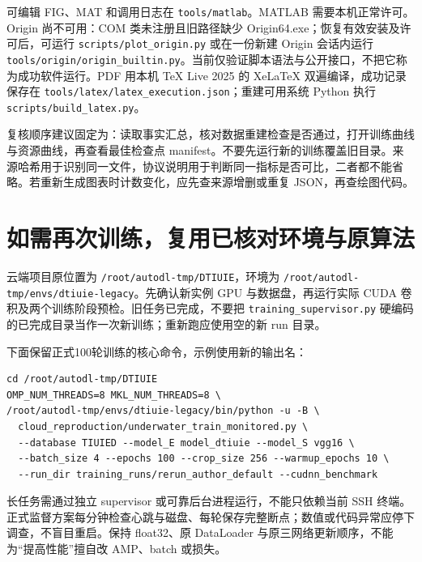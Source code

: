 \documentclass[UTF8,11pt,a4paper,fontset=windows]{ctexart}
\begin{document}
可编辑 FIG、MAT 和调用日志在 \texttt{tools/\allowbreak{}matlab\allowbreak{}}。MATLAB 需要本机正常许可。Origin 尚不可用：COM 类未注册且旧路径缺少 Origin64.exe；恢复有效安装及许可后，可运行 \texttt{scripts/\allowbreak{}plot\allowbreak{}\_\allowbreak{}origin.\allowbreak{}py} 或在一份新建 Origin 会话内运行 \texttt{tools/\allowbreak{}origin\allowbreak{}/\allowbreak{}origin\_\allowbreak{}buil\allowbreak{}tin.\allowbreak{}py}。当前仅验证脚本语法与公开接口，不把它称为成功软件运行。PDF 用本机 TeX Live 2025 的 XeLaTeX 双遍编译，成功记录保存在 \texttt{tools/\allowbreak{}latex/\allowbreak{}latex\_\allowbreak{}execut\allowbreak{}ion.\allowbreak{}json}；重建可用系统 Python 执行 \texttt{scripts/\allowbreak{}buil\allowbreak{}d\_\allowbreak{}latex.\allowbreak{}py}。

复核顺序建议固定为：读取事实汇总，核对数据重建检查是否通过，打开训练曲线与资源曲线，再查看最佳检查点 manifest。不要先运行新的训练覆盖旧目录。来源哈希用于识别同一文件，协议说明用于判断同一指标是否可比，二者都不能省略。若重新生成图表时计数变化，应先查来源增删或重复 JSON，再查绘图代码。

\section{如需再次训练，复用已核对环境与原算法}

云端项目原位置为 \texttt{/\allowbreak{}root/\allowbreak{}autodl\allowbreak{}-\allowbreak{}tmp/\allowbreak{}DTIUIE}，环境为 \texttt{/\allowbreak{}root/\allowbreak{}autodl\allowbreak{}-\allowbreak{}tmp/\allowbreak{}envs/\allowbreak{}dt\allowbreak{}iuie-\allowbreak{}legacy}。先确认新实例 GPU 与数据盘，再运行实际 CUDA 卷积及两个训练阶段预检。旧任务已完成，不要把 \texttt{training\_\allowbreak{}sup\allowbreak{}ervisor.\allowbreak{}py} 硬编码的已完成目录当作一次新训练；重新跑应使用空的新 run 目录。

下面保留正式100轮训练的核心命令，示例使用新的输出名：

\begin{Verbatim}[breaklines=true,breakanywhere=true,fontsize=\scriptsize,frame=single]
cd /root/autodl-tmp/DTIUIE
OMP_NUM_THREADS=8 MKL_NUM_THREADS=8 \
/root/autodl-tmp/envs/dtiuie-legacy/bin/python -u -B \
  cloud_reproduction/underwater_train_monitored.py \
  --database TIUIED --model_E model_dtiuie --model_S vgg16 \
  --batch_size 4 --epochs 100 --crop_size 256 --warmup_epochs 10 \
  --run_dir training_runs/rerun_author_default --cudnn_benchmark
\end{Verbatim}

长任务需通过独立 supervisor 或可靠后台进程运行，不能只依赖当前 SSH 终端。正式监督方案每分钟检查心跳与磁盘、每轮保存完整断点；数值或代码异常应停下调查，不盲目重启。保持 float32、原 DataLoader 与原三网络更新顺序，不能为“提高性能”擅自改 AMP、batch 或损失。
\end{document}
